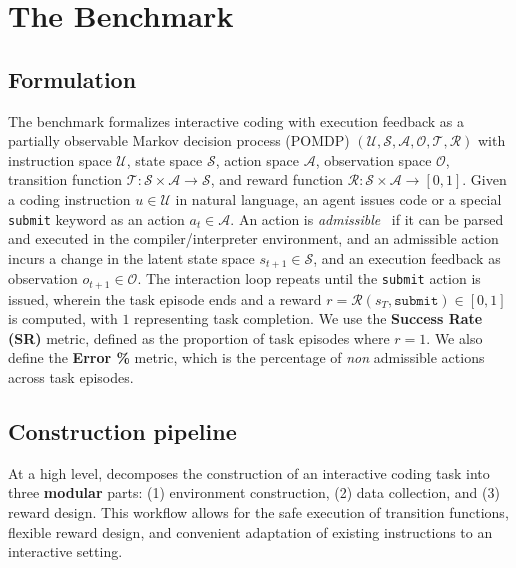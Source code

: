 \section{The \benchmark{} Benchmark}
\label{sec:benchmark}


\subsection{Formulation}
\label{sec:benchmark:formulation}

The \benchmark{} benchmark formalizes interactive coding with execution feedback as a partially observable Markov decision process (POMDP) $(\mathcal{U}, \mathcal{S}, \mathcal{A}, \mathcal{O}, \mathcal{T}, \mathcal{R})$ with instruction space $\mathcal{U}$, state space $\mathcal{S}$, action space $\mathcal{A}$, observation space $\mathcal{O}$, transition function $\mathcal{T}: \mathcal{S} \times \mathcal{A} \to \mathcal{S}$, and reward function $\mathcal{R}: \mathcal{S} \times \mathcal{A} \to [0, 1]$.
Given a  coding instruction $u \in \mathcal{U}$ in natural language, an agent issues code or a special \texttt{submit} keyword as an action $a_t \in \mathcal{A}$.
An action is \textit{admissible}~\cite{yao2020calm} if it can be parsed and executed in the compiler/interpreter environment, and an admissible action incurs a change in the latent state space $s_{t+1} \in \mathcal{S}$, and an execution feedback as observation $o_{t+1} \in \mathcal{O}$.
The interaction loop repeats until the \texttt{submit} action is issued, wherein the task episode ends and a reward $r = \mathcal{R}(s_T, \texttt{submit}) \in [0, 1]$ is computed, with $1$ representing task completion. 
We use the \textbf{Success Rate (SR)} metric, defined as the proportion of task episodes where $r = 1$.
We also define the \textbf{Error \%} metric, which is the percentage of \textit{non} admissible actions across  task episodes.



\subsection{Construction pipeline}
\label{sec:benchmark:construct_pipeline}
At a high level, \benchmark{} decomposes the construction of an interactive coding task into three \textbf{modular} parts: (1) environment construction, (2) data collection, and (3) reward design.
This workflow allows for the safe execution of transition functions, flexible reward design, and convenient adaptation of existing instructions to an interactive setting.

